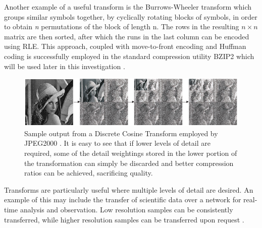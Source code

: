 Another example of a useful transform is the Burrows-Wheeler transform which groups similar symbols together, by cyclically rotating blocks of symbols, in order to 
obtain \textit{n} permutations of the block of length n. The rows in the resulting $n\times n$ matrix are then sorted, after which the runs in the last column can be encoded using RLE. This approach, coupled
with move-to-front encoding and Huffman coding is successfully employed in the standard compression utility BZIP2 which will be used later in this investigation \cite[ch. 8]{salomon2004data}\cite{seward1996bzip2}.
\begin{figure}[h!]
\begin{mdframed}
 \centering
 \includegraphics[width=1.0\textwidth]{DCTSample.png}
 \caption{Sample output from a Discrete Cosine Transform employed by JPEG2000 \cite{952804}. It is easy to see that if lower levels of detail are required, some of the detail weightings stored in
 the lower portion of the transformation can simply be discarded and better compression ratios can be achieved, sacrificing quality.}
 \label{TRANSFORM_SAMPLE}
\end{mdframed}
\end{figure}

Transforms are particularly useful where multiple levels of detail are desired. An example of this may include the transfer of scientific data over a network 
for real-time analysis and observation. Low resolution samples can be consistently transferred, while higher resolution samples can be transferred upon request \cite{Tao:1994:PTS:951087.951108}.

